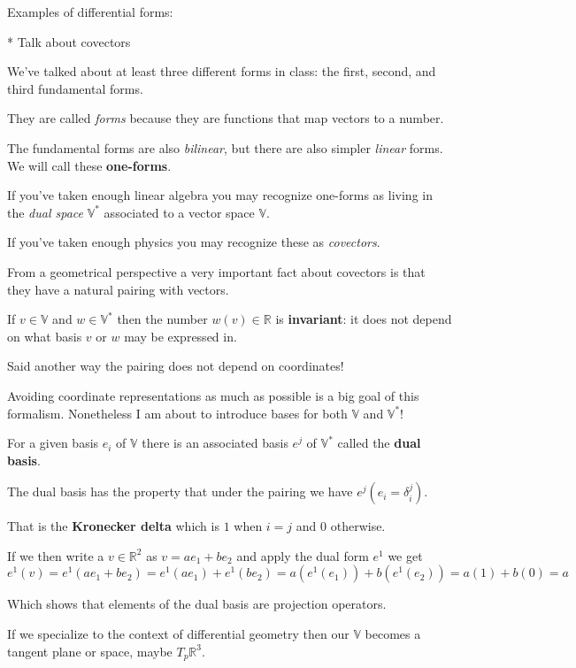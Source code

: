 \documentclass{article}
\begin{document}
Examples of differential forms:

* Talk about covectors

We've talked about at least three different forms in class: the first, second,
and third fundamental forms.

They are called \textit{forms} because they are functions that map vectors to a
number.

The fundamental forms are also \textit{bilinear}, but there are also simpler
\textit{linear} forms. We will call these \textbf{one-forms}.

If you've taken enough linear algebra you may recognize one-forms as living in
the \textit{dual space} $\mathbb{V}^{*}$ associated to a vector space $\mathbb{V}$.

If you've taken enough physics you may recognize these as \textit{covectors}.

From a geometrical perspective a very important fact about covectors is that
they have a natural pairing with vectors.

If $v \in \mathbb{V}$ and $w \in \mathbb{V}^{*}$ then the number $w(v) \in
\mathbb{R}$ is \textbf{invariant}: it does not depend on what basis $v$ or $w$
may be expressed in.

Said another way the pairing does not depend on coordinates!

Avoiding coordinate representations as much as possible is a big goal of this
formalism. Nonetheless I am about to introduce bases for both $\mathbb{V}$ and $\mathbb{V}^{*}$!

For a given basis $e_{i}$ of $\mathbb{V}$ there is an associated basis $e^{j}$
of $\mathbb{V}^{*}$ called the \textbf{dual basis}.

The dual basis has the property that under the pairing we have $e^{j}(e_{i} = \delta^{j}_{i})$.

That is the \textbf{Kronecker delta} which is $1$ when $i = j$ and $0$
otherwise.

If we then write a $v \in \mathbb{R}^{2}$ as $v = ae_{1} + be_{2}$ and apply the
dual form $e^{1}$ we get $e^{1} (v) = e^{1}(ae_{1} + be_{2}) = e^{1}(ae_{1}) +
  e^{1}(be_{2}) = a(e^{1}(e_{1})) + b(e^{1}(e_{2})) = a(1) + b(0) = a$

Which shows that elements of the dual basis are projection operators.

If we specialize to the context of differential geometry then our $\mathbb{V}$
becomes a tangent plane or space, maybe $T_{p}\mathbb{R}^{3}$.
\end{document}
